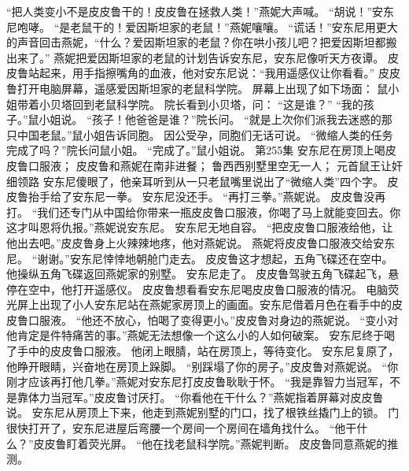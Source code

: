 \documentclass[a4paper,12pt,UTF8,twoside]{ctexbook}
\begin{document}
        “把人类变小不是皮皮鲁干的！皮皮鲁在拯救人类！”燕妮大声喊。  
        “胡说！”安东尼咆哮。        
        “是老鼠干的！爱因斯坦家的老鼠！”燕妮嚷嚷。  
        “谎话！”安东尼用更大的声音回击燕妮，“什么？爱因斯坦家的老鼠？你在哄小孩儿吧？把爱因斯坦都搬出来了。”  
        燕妮把爱因斯坦家的老鼠的计划告诉安东尼，安东尼像听天方夜谭。  
        皮皮鲁站起来，用手指擦嘴角的血液，他对安东尼说：“我用遥感仪让你看看。”  
        皮皮鲁打开电脑屏幕，遥感爱因斯坦家的老鼠科学院。  
        屏幕上出现了如下场面：  
        鼠小姐带着小贝塔回到老鼠科学院。  
        院长看到小贝塔，问：  
        “这是谁？”  
        “我的孩子。”鼠小姐说。  
        “孩子！他爸爸是谁？”院长问。  
        “就是上次你们派我去迷惑的那只中国老鼠。”鼠小姐告诉同胞。  
        因公受孕，同胞们无话可说。  
        “微缩人类的任务完成了吗？”院长问鼠小姐。  
        “完成了。”鼠小姐说。          第255集  
        安东尼在房顶上喝皮皮鲁口服液；  
        皮皮鲁和燕妮在南非进餐；  
        鲁西西别墅里空无一人；  
        元首鼠王让奸细领路    
        安东尼傻眼了，他亲耳听到从一只老鼠嘴里说出了“微缩人类”四个字。  
        皮皮鲁抬手给了安东尼一拳。  
        安东尼没还手。  
        “再打三拳。”燕妮说。  
        皮皮鲁没再打。  
        “我们还专门从中国给你带来一瓶皮皮鲁口服液，你喝了马上就能变回去。你这才叫恩将仇报。”燕妮说安东尼。  
        安东尼无地自容。  
        “把皮皮鲁口服液给他，让他出去吧。”皮皮鲁身上火辣辣地疼，他对燕妮说。  
        燕妮将皮皮鲁口服液交给安东尼。  
        “谢谢。”安东尼悻悻地朝舱门走去。  
        皮皮鲁这才想起，五角飞碟还在空中。他操纵五角飞碟返回燕妮家的别墅。  
        安东尼走了。  
        皮皮鲁驾驶五角飞碟起飞，悬停在空中，他打开遥感仪。  
        皮皮鲁想看看安东尼喝皮皮鲁口服液的情况。  
        电脑荧光屏上出现了小人安东尼站在燕妮家房顶上的画面。安东尼借着月色在看手中的皮皮鲁口服液。  
        “他还不放心，怕喝了变得更小。”皮皮鲁对身边的燕妮说。  
        “变小对他肯定是件特痛苦的事。”燕妮无法想像一个这么小的人如何破案。  
        安东尼终于喝了手中的皮皮鲁口服液。  
        他闭上眼腈，站在房顶上，等待变化。  
        安东尼复原了，他睁开眼睛，兴奋地在房顶上跺脚。  
        “别踩塌了你的房子。”皮皮鲁对燕妮说。  
        “你刚才应该再打他几拳。”燕妮对安东尼打皮皮鲁耿耿于怀。  
        “我是靠智力当冠军，不是靠体力当冠军。”皮皮鲁讨厌打。  
        “你看他在干什么？”燕妮指着屏幕对皮皮鲁说。  
        安东尼从房顶上下来，他走到燕妮别墅的门口，找了根铁丝撬门上的锁。  
        门很快打开了，安东尼进屋后弯腰一个房间一个房间在墙角找什么。  
        “他干什么？”皮皮鲁盯着荧光屏。  
        “他在找老鼠科学院。”燕妮判断。  
        皮皮鲁同意燕妮的推测。  
\end{document}
